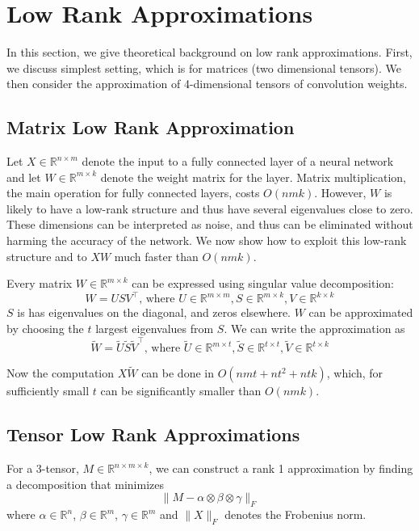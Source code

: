 \section{Low Rank Approximations}
In this section, we give theoretical background on low rank approximations. First, we discuss simplest setting, which is
for matrices (two dimensional tensors). We then consider the approximation of 4-dimensional tensors of convolution weights.


\subsection{Matrix Low Rank Approximation}
Let $X \in \mathbb{R}^{n \times m}$ denote the input to a fully connected layer of a neural network and let $W \in \mathbb{R}^{m \times k}$ denote the weight matrix for the layer. Matrix multiplication,  the main operation for fully connected layers, costs $O(nmk)$. However, $W$ is likely to have a low-rank structure and thus have several eigenvalues close to zero. These dimensions can be interpreted as noise, and thus can be eliminated without harming the accuracy of the network. We now show how to exploit this low-rank structure and to $XW$ much faster than $O(nmk)$. 


Every matrix $W \in \mathbb{R}^{m \times k}$ can be expressed using singular value decomposition:
\begin{equation*}
	W = USV^{\top}\text{, where }U \in \mathbb{R}^{m \times m}, S \in \mathbb{R}^{m \times k}, V \in \mathbb{R}^{k \times k}
\end{equation*}
$S$ is has eigenvalues on the diagonal, and zeros elsewhere. $W$ can be approximated by choosing the $t$ largest 
eigenvalues from $S$. We can write the approximation as
\begin{equation*}
	\tilde{W} = \tilde{U}\tilde{S}\tilde{V}^{\top}\text{, where }\tilde{U} \in \mathbb{R}^{m \times t}, \tilde{S} \in \mathbb{R}^{t \times t}, \tilde{V} \in \mathbb{R}^{t \times k}
\end{equation*}

Now the computation $X\tilde{W}$ can be done in $O(nmt + nt^2 + ntk)$, which, for sufficiently small $t$ can be significantly smaller than $O(nmk)$. 

\subsection{Tensor Low Rank Approximations}

For a 3-tensor, $M \in \mathbb{R}^{n \times m \times k}$, we can construct a rank 1 approximation by finding a decomposition that minimizes 
\begin{equation*}
	\| M - \alpha \otimes \beta \otimes \gamma \|_F
\end{equation*} 
where $\alpha \in \mathbb{R}^n$, $\beta \in \mathbb{R}^m$, $\gamma \in \mathbb{R}^m$ and $\|X\|_F$ denotes the Frobenius norm.


